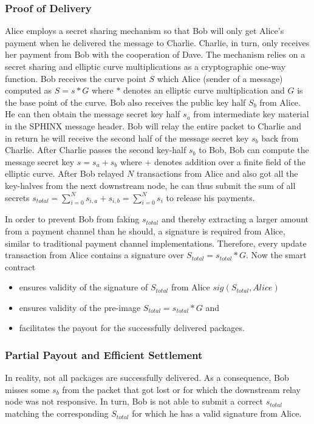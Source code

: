 \documentclass{article}
\begin{document}
\subsubsection{Proof of Delivery}
Alice employs a secret sharing mechanism so that Bob will only get Alice's payment when he delivered the message to Charlie. Charlie, in turn, only receives her payment from Bob with the cooperation of Dave. The mechanism relies on a secret sharing and elliptic curve multiplications as a cryptographic one-way function. Bob receives the curve point $S$ which Alice (sender of a message) computed as $S = s * G$ where $*$ denotes an elliptic curve multiplication and $G$ is the base point of the curve. Bob also receives the public key half $S_b$ from Alice. He can then obtain the message secret key half $s_a$ from intermediate key material in the SPHINX message header. Bob will relay the entire packet to Charlie and in return he will receive the second half of the message secret key $s_b$ back from Charlie. After Charlie passes the second key-half $s_b$ to Bob, Bob can compute the message secret key $s = s_a + s_b$ where $+$ denotes addition over a finite field of the elliptic curve. After Bob relayed $N$ transactions from Alice and also got all the key-halves from the next downstream node, he can thus submit the sum of all secrets $s_{total} = \sum_{i=0}^{N} s_{i,a} + s_{i,b} = \sum_{i=0}^{N} s_i$ to release his payments.

In order to prevent Bob from faking $s_{total}$ and thereby extracting a larger amount from a payment channel than he should, a signature is required from Alice, similar to traditional payment channel implementations. Therefore, every update transaction from Alice contains a signature over $S_{total} = s_{total} * G$. Now the smart contract

\begin{itemize}
    \item ensures validity of the signature of $S_{total}$ from Alice $sig(S_{total}, Alice)$
    \item ensures validity of the pre-image $S_{total} = s_{total} * G$ and
    \item facilitates the payout for the successfully delivered packages.
\end{itemize}

\subsubsection{Partial Payout and Efficient Settlement}
\noindent In reality, not all packages are successfully delivered. As a consequence, Bob misses some $s_b$ from the packet that got lost or for which the downstream relay node was not responsive. In turn, Bob is not able to submit a correct $s_{total}$ matching the corresponding $S_{total}$ for which he has a valid signature from Alice.
\end{document}
